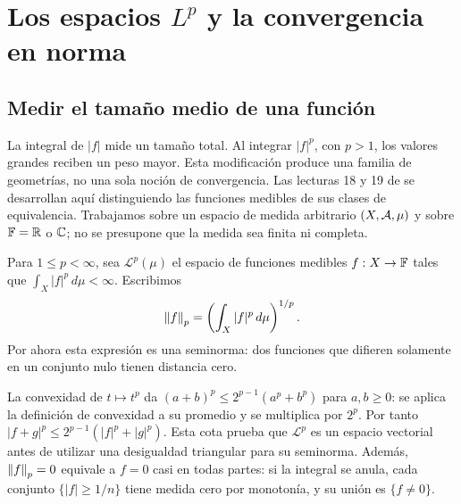 \chapter{Los espacios \texorpdfstring{$L^p$}{Lp} y la convergencia en norma}\label{v2:cap09}\label{cap:v2-09}
\section{Medir el tamaño medio de una función}\label{lectura:v2-18}
La integral de $|f|$ mide un tamaño total. Al integrar $|f|^p$, con $p>1$, los valores grandes reciben un peso mayor. Esta modificación produce una familia de geometrías, no una sola noción de convergencia. Las lecturas 18 y 19 de \cite{valencia2} se desarrollan aquí distinguiendo las funciones medibles de sus clases de equivalencia. Trabajamos sobre un espacio de medida arbitrario $(X,\mathcal A,\mu)$ y sobre $\mathbb F=\mathbb R$ o $\mathbb C$; no se presupone que la medida sea finita ni completa.

\begin{definicion}
Para $1\le p<\infty$, sea $\mathcal L^p(\mu)$ el espacio de funciones medibles $f:X\to\mathbb F$ tales que $\int_X|f|^p\,d\mu<\infty$. Escribimos
\[
 \left\lVert f\right\rVert_p=\left(\int_X|f|^p\,d\mu\right)^{1/p}.
\]
Por ahora esta expresión es una seminorma: dos funciones que difieren solamente en un conjunto nulo tienen distancia cero.
\end{definicion}
La convexidad de $t\mapsto t^p$ da $(a+b)^p\le2^{p-1}(a^p+b^p)$ para $a,b\ge0$: se aplica la definición de convexidad a su promedio y se multiplica por $2^p$. Por tanto $|f+g|^p\le2^{p-1}(|f|^p+|g|^p)$. Esta cota prueba que $\mathcal L^p$ es un espacio vectorial antes de utilizar una desigualdad triangular para su seminorma. Además, $\left\lVert f\right\rVert_p=0$ equivale a $f=0$ casi en todas partes: si la integral se anula, cada conjunto $\{|f|\ge1/n\}$ tiene medida cero por monotonía, y su unión es $\{f\ne0\}$.

